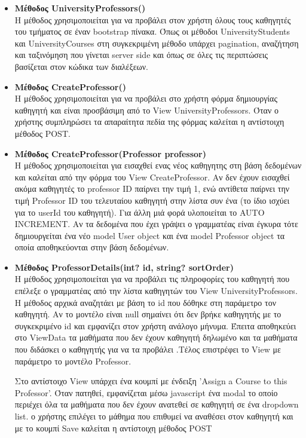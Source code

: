 \documentclass[12pt]{article}
\begin{document}
\begin{itemize}
	\item \textbf{Μέθοδος UniversityProfessors()}\\
	Η μέθοδος χρησιμοποιείται για να προβάλει στον χρήστη όλους τους καθηγητές του τμήματος σε έναν bootstrap πίνακα. Όπως οι μέθοδοι UniversityStudents και UniversityCourses στη συγκεκριμένη μέθοδο υπάρχει pagination, αναζήτηση και ταξινόμηση που γίνεται server side και όπως σε όλες τις περιπτώσεις βασίζεται στον κώδικα των διαλέξεων.
	
	\item \textbf{Μέθοδος CreateProfessor()}\\
	Η μέθοδος χρησιμοποιείται για να προβάλει στο χρήστη φόρμα δημιουργίας καθηγητή και είναι προσβάσιμη από το View UniversityProfessors. Όταν ο χρήστης συμπληρώσει τα απαραίτητα πεδία της φόρμας καλείται η αντίστοιχη μέθοδος POST.
			
	\item \textbf{Μέθοδος CreateProfessor(Professor professor)}\\
	Η μέθοδος χρησιμοποιείται για εισαχθεί ενας νέος καθηγητης στη βάση δεδομένων και καλείται από την φόρμα του View CreateProfessor. Αν δεν έχουν εισαχθεί ακόμα καθηγητές το  professor ID παίρνει την τιμή 1, ενώ αντίθετα παίρνει την τιμή Professor ID του τελευταίου καθηγητή στην λίστα συν ένα (το ίδιο ισχύει για το userId του καθηγητή). Για άλλη μιά φορά υλοποιείται το AUTO INCREMENT. Αν τα δεδομένα που έχει γράψει ο γραμματέας είναι έγκυρα τότε δημιουργείται ένα νέο model User object και ένα model Professor object τα οποία αποθηκεύονται στην βάση δεδομένων.


	\item \textbf{Μέθοδος ProfessorDetails(int? id, string? sortOrder)}\\
	Η μέθοδος χρησιμοποιείται για να προβάλει τις πληροφορίες του καθηγητή που επέλεξε ο γραμματέας από την λίστα καθηγητών του View UniversityProfessors. Η μέθοδος αρχικά αναζητάει με βάση το id που δόθηκε στη παράμετρο τον καθηγητή. Αν το μοντέλο είναι null σημαίνει ότι δεν βρήκε καθηγητής με το συγκεκριμένο id και εμφανίζει στον χρήστη ανάλογο μήνυμα. Έπειτα αποθηκεύει στο ViewData τα  μαθήματα που δεν έχουν καθηγητή δηλωμένο και τα μαθήματα που διδάσκει ο καθηγητής  για να τα προβάλει .Τέλος επιστρέφει το View με παράμετρο το μοντέλο Professor.
	
	Στο αντίστοιχο View υπάρχει ένα κουμπί με ένδειξη 'Assign a Course to this Professor'. Όταν πατηθεί, εμφανίζεται μέσω javascript ένα modal το οποίο περιέχει όλα τα μαθήματα που δεν έχουν ανατεθεί σε καθηγητή σε ένα dropdown list. ο χρήστης επιλέγει το μάθημα που επιθυμεί να αναθέσει στον καθηγητή και με το κουμπί Save καλείται η αντίστοιχη μέθοδος POST
	

\end{itemize}
\end{document}
